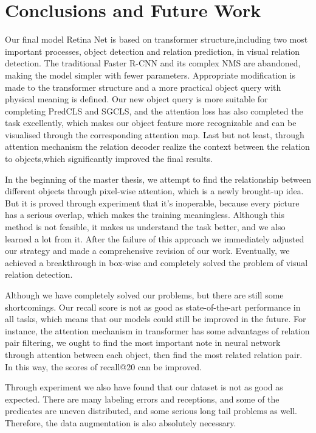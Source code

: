 \chapter{Conclusions and Future Work}
\label{chap:conclusion}
Our final model Retina Net is based on transformer structure,including two most important processes, object detection and relation prediction,  in visual relation detection. The traditional Faster R-CNN and its complex NMS are abandoned, making the model simpler with fewer parameters. Appropriate modification is made to the transformer structure and a more practical object query with physical meaning is defined. Our new object query is more suitable for completing PredCLS and SGCLS, and the attention loss has also completed the task excellently, which makes our object feature more recognizable and can be visualised through the corresponding attention map. Last but not least, through attention mechanism the relation decoder  realize the context between the relation to objects,which significantly improved the final results.

In the beginning of the master thesis, we attempt to  find the relationship between different objects through pixel-wise attention, which is a newly brought-up idea. But it is proved through experiment that it's inoperable, because every picture has a serious overlap, which makes the training meaningless. Although this method is not feasible, it makes us understand the task better, and we also learned a lot from it. After the failure of this approach we immediately adjusted our strategy and made a comprehensive revision of our work. Eventually, we achieved a breakthrough in box-wise and completely solved the problem of visual relation detection.

Although we have completely solved our problems, but there are still some shortcomings. Our recall score is not as good as state-of-the-art performance in all tasks, which means that our models could still be improved in the future. For instance, the attention mechanism in transformer has some advantages of relation pair filtering, we ought to find the most important note in neural network through attention between each object, then find the most related relation pair. In this way, the scores of recall@20 can be improved.

Through experiment we also have found that our dataset is not as good as expected. There are many labeling errors and receptions, and some of the predicates are uneven distributed, and some serious long tail problems as well. Therefore, the data augmentation is also absolutely necessary.